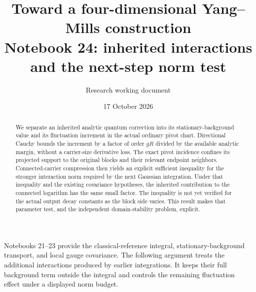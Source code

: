 \documentclass[11pt]{article}
\title{Toward a four-dimensional Yang--Mills construction\\
\large Notebook 24: inherited interactions and the next-step norm test}
\author{Research working document}
\date{17 October 2026}
\theoremstyle{remark}
\begin{document}
\maketitle
\begin{abstract}
We separate an inherited analytic quantum correction into its
stationary-background value and its fluctuation increment in
the actual ordinary pivot chart. Directional Cauchy bounds the
increment by a factor of order $gR$ divided by the available
analytic margin, without a carrier-size derivative loss.
The exact pivot incidence confines its projected support to
the original blocks and their relevant endpoint neighbors.
Connected-carrier compression then yields an explicit
sufficient inequality for the stronger interaction norm
required by the next Gaussian integration. Under that
inequality and the existing covariance hypotheses, the
inherited contribution to the connected logarithm has the
same small factor. The inequality is not yet verified for
the actual output decay constants as the block side varies.
This result makes that parameter test, and the independent
domain-stability problem, explicit.
\end{abstract}

Notebooks 21--23 provide the classical-reference integral,
stationary-background transport, and local gauge covariance.
The following argument treats the additional interactions
produced by earlier integrations. It keeps their full
background term outside the integral and controls the
remaining fluctuation effect under a displayed norm budget.
\end{document}
